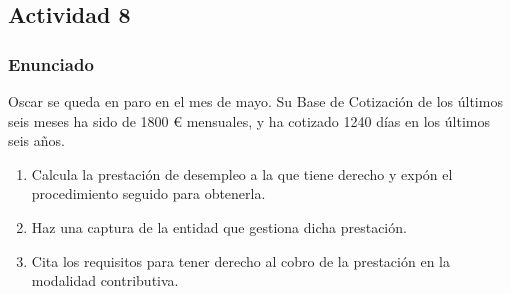\subsection{Actividad 8}

\subsubsection{Enunciado}
Oscar se queda en paro en el mes de mayo. Su Base de Cotización de los últimos seis meses ha sido de 1800 € mensuales, y ha cotizado 1240 días en los últimos seis años.

\begin{enumerate}[label=\alph*)]
    \item Calcula la prestación de desempleo a la que tiene derecho y expón el procedimiento seguido para obtenerla.
    \item Haz una captura de la entidad que gestiona dicha prestación.
    \item Cita los requisitos para tener derecho al cobro de la prestación en la modalidad contributiva.
\end{enumerate}

